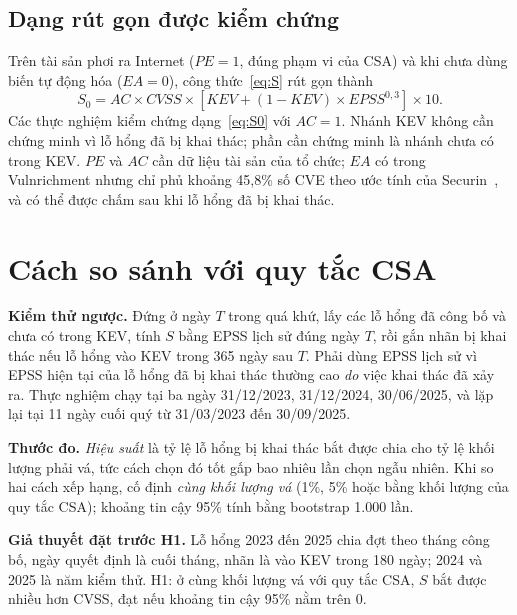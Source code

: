 \documentclass[conference]{IEEEtran}
\begin{document}
\subsection{Dạng rút gọn được kiểm chứng}
Trên tài sản phơi ra Internet ($\mathit{PE} = 1$, đúng phạm vi của CSA) và khi chưa dùng biến tự động hóa
($\mathit{EA} = 0$), công thức~\eqref{eq:S} rút gọn thành
\begin{equation}
S_0 = AC \times \mathit{CVSS} \times \left[\mathit{KEV} + (1-\mathit{KEV}) \times \mathit{EPSS}^{0{,}3}\right] \times 10.
\label{eq:S0}
\end{equation}
Các thực nghiệm kiểm chứng dạng~\eqref{eq:S0} với $AC = 1$. Nhánh KEV không cần chứng minh vì lỗ hổng đã bị khai
thác; phần cần chứng minh là nhánh chưa có trong KEV. $\mathit{PE}$ và $AC$ cần dữ liệu tài sản của tổ chức;
$\mathit{EA}$ có trong Vulnrichment nhưng chỉ phủ khoảng 45,8\% số CVE theo ước tính của Securin~\cite{securin2026},
và có thể được chấm sau khi lỗ hổng đã bị khai thác.

\section{Cách so sánh với quy tắc CSA}\label{sec:trienkhai}

\textbf{Kiểm thử ngược.} Đứng ở ngày $T$ trong quá khứ, lấy các lỗ hổng đã công bố và chưa có trong KEV, tính $S$
bằng EPSS lịch sử đúng ngày $T$, rồi gắn nhãn bị khai thác nếu lỗ hổng vào KEV trong 365 ngày sau $T$. Phải dùng EPSS
lịch sử vì EPSS hiện tại của lỗ hổng đã bị khai thác thường cao \emph{do} việc khai thác đã xảy ra. Thực nghiệm chạy
tại ba ngày 31/12/2023, 31/12/2024, 30/06/2025, và lặp lại tại 11 ngày cuối quý từ 31/03/2023 đến 30/09/2025.

\textbf{Thước đo.} \emph{Hiệu suất} là tỷ lệ lỗ hổng bị khai thác bắt được chia cho tỷ lệ khối lượng phải vá, tức
cách chọn đó tốt gấp bao nhiêu lần chọn ngẫu nhiên. Khi so hai cách xếp hạng, cố định \emph{cùng khối lượng vá}
(1\%, 5\% hoặc bằng khối lượng của quy tắc CSA); khoảng tin cậy 95\% tính bằng bootstrap 1.000 lần.

\textbf{Giả thuyết đặt trước H1.} Lỗ hổng 2023 đến 2025 chia đợt theo tháng công bố, ngày quyết định là cuối tháng,
nhãn là vào KEV trong 180 ngày; 2024 và 2025 là năm kiểm thử. H1: ở cùng khối lượng vá với quy tắc CSA, $S$ bắt được
nhiều hơn CVSS, đạt nếu khoảng tin cậy 95\% nằm trên 0.
\end{document}
